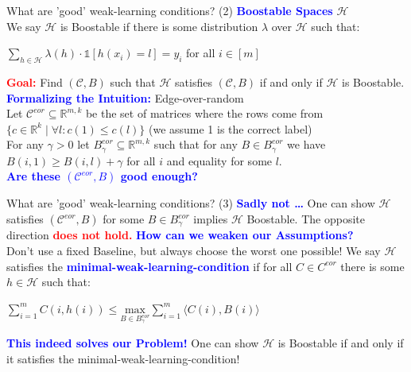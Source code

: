 \documentclass{beamer}
\begin{document}
\begin{frame}{What are 'good' weak-learning conditions? (2)}
    \textbf{\textcolor{blue}{Boostable Spaces}} $\mathcal{H}$ \\
    We say $\mathcal{H}$ is Boostable if there is some distribution $\lambda$ over $\mathcal{H}$ such that: \\
    \begin{center}
        $\sum_{h \in \mathcal{H}} \lambda(h) \cdot \mathds{1}[h(x_i) = l] = y_i$ for all $i \in [m]$
    \end{center}
    \bigbreak
    \textbf{\textcolor{red}{Goal:}} Find $(\mathcal{C},B)$ such that $\mathcal{H}$ satisfies $(\mathcal{C}, B)$ if and only if $\mathcal{H}$ is Boostable. \\
    \bigbreak
    \textbf{\textcolor{blue}{Formalizing the Intuition:}} Edge-over-random \\
    Let $\mathcal{C}^{eor} \subseteq \mathbb{R}^{m,k}$ be the set of matrices where the rows come from $\{c \in \mathbb{R}^k \mid \forall l: c(1) \leq c(l)\}$ (we assume 1 is the correct label) \\
    \bigbreak
    For any $\gamma > 0$ let $B_{\gamma}^{eor} \subseteq \mathbb{R}^{m,k}$ such that for any $B \in B_{\gamma}^{eor}$ we have $B(i,1) \geq B(i,l) + \gamma$ for all $i$ and equality for some $l$. \\
    \textbf{\textcolor{blue}{Are these $(\mathcal{C}^{eor}, B)$ good enough?}}
\end{frame}

\begin{frame}{What are 'good' weak-learning conditions? (3)}
    \textbf{\textcolor{blue}{Sadly not \dots}}
    One can show $\mathcal{H}$ satisfies $(\mathcal{C}^{eor}, B)$ for some $B \in B_{\gamma}^{eor}$ implies $\mathcal{H}$ Boostable.
    The opposite direction \textbf{\textcolor{red}{does not hold.}}
    \bigbreak
    \textbf{\textcolor{blue}{How can we weaken our Assumptions?}} \\
    Don't use a fixed Baseline, but always choose the worst one possible!
    \bigbreak
    We say $\mathcal{H}$ satisfies the \textbf{\textcolor{blue}{minimal-weak-learning-condition}} if for all $C \in C^{eor}$ there is some $h \in \mathcal{H}$ such that:
    \bigbreak
    \begin{center}
        $\sum_{i = 1}^{m} C(i, h(i)) \leq \underset{B \in B_{\gamma}^{eor}}{\text{max}} \sum_{i = 1}^{m} \langle C(i), B(i)\rangle$
    \end{center}

    \textbf{\textcolor{blue}{This indeed solves our Problem!}}
    One can show $\mathcal{H}$ is Boostable if and only if it satisfies the minimal-weak-learning-condition!
\end{frame}
\end{document}
